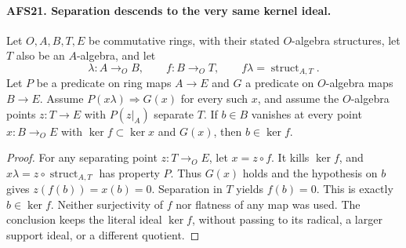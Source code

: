\documentclass[11pt,a4paper]{article}
\numberwithin{equation}{section}
\theoremstyle{remark}\newtheorem{remark}[theorem]{Remark}
\begin{document}
\paragraph{AFS21. Separation descends to the very same kernel ideal.}
\label{claim:AFS21}
Let $O,A,B,T,E$ be commutative rings, with their stated
$O$-algebra structures, let $T$ also be an $A$-algebra,
and let
\[
 \lambda:A\to_O B,\qquad f:B\to_O T,
          \qquad f\lambda=\operatorname{struct}_{A,T}.
\]
Let $P$ be a predicate on ring maps $A\to E$ and $G$ a
predicate on $O$-algebra maps $B\to E$.  Assume
$P(x\lambda)\Rightarrow G(x)$ for every such $x$, and
assume the $O$-algebra points $z:T\to E$ with
$P(z|_A)$ separate $T$.  If $b\in B$ vanishes at
every point $x:B\to_O E$ with
$\ker f\subset\ker x$ and $G(x)$, then $b\in\ker f$.
\begin{proof}
For any separating point $z:T\to_O E$, let $x=z\circ f$.
It kills $\ker f$, and
$x\lambda=z\circ\operatorname{struct}_{A,T}$ has property
$P$.  Thus $G(x)$ holds and the hypothesis on $b$ gives
$z(f(b))=x(b)=0$.  Separation in $T$ yields $f(b)=0$.
This is exactly $b\in\ker f$.  Neither surjectivity of
$f$ nor flatness of any map was used.  The conclusion
keeps the literal ideal $\ker f$, without passing to
its radical, a larger support ideal, or a different
quotient.
\end{proof}

\end{document}
